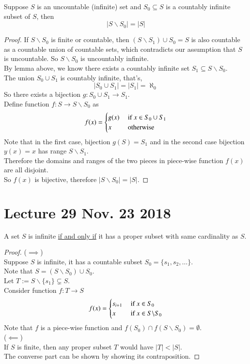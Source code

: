 \documentclass[10pt]{article}
\begin{document}
		\begin{theorem}
			Suppose $S$ is an uncountable (infinite) set and $S_0 \subseteq S$ is a countably infinite subset of $S$, then
			\[
				|S \backslash S_0| = |S|
			\]
		\end{theorem}
		\begin{proof}
			If $S\backslash S_0$ is finite or countable, then $(S\backslash S_1) \cup S_0 = S$ is also countable as a countable union of countable sets, which contradicts our assumption that $S$ is uncountable. So $S \backslash S_0$ is uncountably infinite. \\
			By lemma above, we know there exists a countably infinite set $S_1 \subseteq S \backslash S_0$. \\
			The union $S_0 \cup S_1$ is countably infinite, that's,
			\[
				|S_0 \cup S_1| = |S_1| = \aleph_0
			\]
			So there exists a bijection $g:S_0 \cup S_1 \to S_1$. \\
			Define function $f: S \to S \backslash S_0$ as 
			\[
				f(x) = \begin{cases}
					g(x) &\text{{ if }} x \in S_0 \cup S_1 \\
					x &\text{{ otherwise}}
				\end{cases}
			\]
			Note that in the first case, bijection $g(S) = S_1$ and in the second case bijection $y(x)=x$ has range $S \backslash S_1$. \\
			Therefore the domains and ranges of the two pieces in piece-wise function $f(x)$ are all disjoint. \\
			So $f(x)$ is bijective, therefore $|S \backslash S_0| = |S|$.
		\end{proof}
	\section{Lecture 29 Nov. 23 2018}
		\begin{theorem}
			A set $S$ is infinite \ul{if and only if} it has a proper subset with same cardinality as $S$.
		\end{theorem}
		\begin{proof}
			($\implies$) \\
			Suppose $S$ is infinite, it has a countable subset $S_0 = \{s_1, s_2, \dots\}$.\\
			Note that $S = (S\backslash S_0) \cup S_0$. \\
			Let $T := S \backslash \{s_1\} \subsetneq S$. \\
			Consider function $f:T \to S$
			\[
				f(x) = \begin{cases}
					s_{i+1} &\text{{ if }} x \in S_0 \\
					x &\text{{ if }} x \in S \backslash S_0
				\end{cases}
			\]
			Note that $f$ is a piece-wise function and $f(S_0) \cap f(S\backslash S_0) = \emptyset$. \\
			($\impliedby$) \\
			If $S$ is finite, then any proper subset $T$ would have $|T| < |S|$. \\
			The converse part can be shown by showing its contraposition.
		\end{proof}
		
\end{document}
